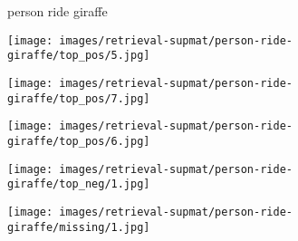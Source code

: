 \documentclass[10pt,twocolumn,letterpaper]{article}
\begin{document}
\begin{figure*}[t]
	\begin{minipage}[b]{0.005\textwidth}
    	\centering
    	\begin{turn}{90}
    \small{{\color{blue}person} ride {\color{red}giraffe}}
    	\end{turn}	
    \vspace{-1.2ex}
    \end{minipage}
    \hspace{0.01\textwidth}
    \begin{minipage}[t]{0.18\textwidth}
    	\centering
       	\texttt{[image: images/retrieval-supmat/person-ride-giraffe/top\_pos/5.jpg]}\\
       	\vspace{1.5ex}
    \end{minipage}
    \hspace{0.005\textwidth}
    \begin{minipage}[t]{0.18\textwidth}
    	\centering
       	\texttt{[image: images/retrieval-supmat/person-ride-giraffe/top\_pos/7.jpg]}\\
       	\vspace{1.5ex}
    \end{minipage}
    \hspace{0.005\textwidth}
    \begin{minipage}[t]{0.18\textwidth}
       \centering
       \texttt{[image: images/retrieval-supmat/person-ride-giraffe/top\_pos/6.jpg]}\\
       \vspace{1.5ex}
    \end{minipage}
    \hspace{0.005\textwidth}  
    \begin{minipage}[t]{0.18\textwidth}
    	\centering
       	\texttt{[image: images/retrieval-supmat/person-ride-giraffe/top\_neg/1.jpg]}\\
      	\vspace{1.5ex}
    \end{minipage}  
    \hspace{0.005\textwidth}
    \begin{minipage}[t]{0.18\textwidth}
    	\centering
       	\texttt{[image: images/retrieval-supmat/person-ride-giraffe/missing/1.jpg]}\\
       	\vspace{1.5ex}
    \end{minipage}
  

\end{figure*}
\end{document}

